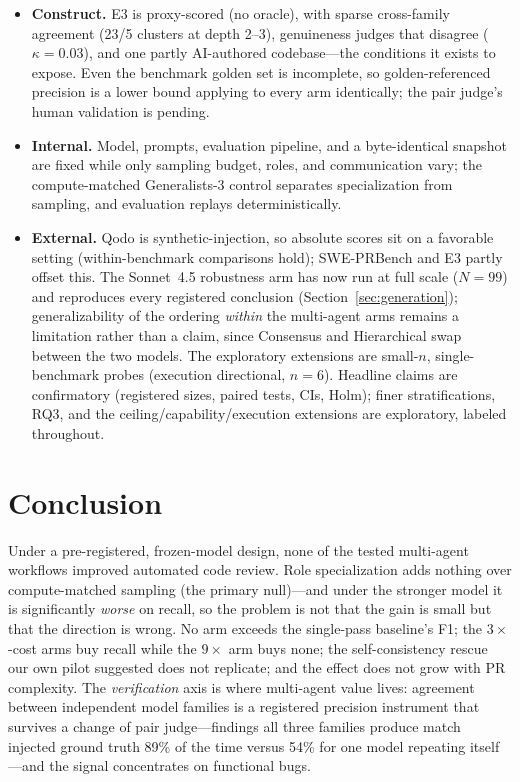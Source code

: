 \documentclass[conference]{IEEEtran}
\begin{document}
\begin{itemize}
  \item \textbf{Construct.} E3 is proxy-scored (no oracle), with sparse
  cross-family agreement (23/5 clusters at depth 2--3), genuineness judges that
  disagree ($\kappa{=}0.03$), and one partly AI-authored codebase---the
  conditions it exists to expose. Even the benchmark golden set is incomplete, so
  golden-referenced precision is a lower bound applying to every arm identically;
  the pair judge's human validation is pending.
  \item \textbf{Internal.} Model, prompts, evaluation pipeline, and a
  byte-identical snapshot are fixed while only sampling budget, roles, and
  communication vary; the compute-matched Generalists-3 control separates
  specialization from sampling, and evaluation replays deterministically.
  \item \textbf{External.} Qodo is synthetic-injection, so absolute scores sit on
  a favorable setting (within-benchmark comparisons hold); SWE-PRBench and E3
  partly offset this. The Sonnet~4.5 robustness arm has now run at full scale
  ($N{=}99$) and reproduces every registered conclusion
  (Section~\ref{sec:generation}); generalizability of the ordering
  \emph{within} the multi-agent arms remains a limitation rather than a claim,
  since Consensus and Hierarchical swap between the two models. The exploratory
  extensions are small-$n$, single-benchmark probes (execution directional,
  $n{=}6$). Headline
  claims are confirmatory (registered sizes, paired tests, CIs, Holm); finer
  stratifications, RQ3, and the ceiling/capability/execution extensions are
  exploratory, labeled throughout.
\end{itemize}

\section{Conclusion}

Under a pre-registered, frozen-model design, none of the tested multi-agent
workflows improved automated code review. Role specialization adds nothing over
compute-matched sampling (the primary null)---and under the stronger model it is
significantly \emph{worse} on recall, so the problem is not that the gain is
small but that the direction is wrong. No arm exceeds the single-pass baseline's
F1; the $3\times$-cost arms buy recall while the $9\times$ arm buys none; the
self-consistency rescue our own pilot suggested does not replicate; and the
effect does not grow with PR complexity. The \emph{verification} axis is
where multi-agent value lives: agreement between independent model families is a
registered precision instrument that survives a change of pair
judge---findings all three families produce match injected ground truth 89\% of
the time versus 54\% for one model repeating itself---and the signal concentrates
on functional bugs.
\end{document}

